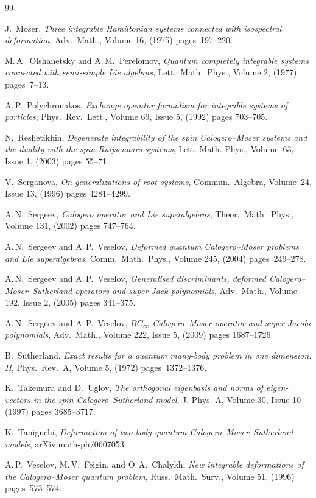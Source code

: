 \documentclass[12pt]{amsart}
\numberwithin{equation}{section}
\theoremstyle{definition}
\begin{document}
\begin{small}
\begin{thebibliography}{99}
{
J.\ Moser, \textit{Three integrable Hamiltonian systems connected with isospectral deformation}, Adv.\ Math., Volume 16, (1975) pages~197--220.

M.\,A.\ Olshanetsky and A.\,M.\ Perelomov, \textit{Quantum completely integrable systems connected with semi-simple Lie algebras}, Lett.\ Math.\ Phys., Volume 2, (1977) pages~7--13.

A.\,P.\ Polychronakos, \textit{Exchange operator formalism for integrable systems of particles}, Phys.\ Rev.\ Lett., Volume 69, Issue 5, (1992) pages 703--705.

N.\ Reshetikhin, \textit{ 
Degenerate integrability of the spin Calogero--Moser systems and the duality with the spin Ruijsenaars systems}, Lett. Math. Phys., Volume~63, Issue 1, (2003) pages 55--71.


V.\ Serganova, \textit{On generalizations of root systems}, Commun.\ Algebra, Volume~24, Issue 13, (1996) pages 4281--4299.

A.\,N.\ Sergeev, \textit{Calogero operator and Lie superalgebras}, Theor.\ Math.\ Phys., Volume 131, (2002) pages 747--764. 

A.\,N.\ Sergeev and A.\,P.\ Veselov, \textit{Deformed quantum Calogero--Moser problems and Lie superalgebras}, Comm.\ Math.\ Phys., Volume 245, (2004) pages~249--278.

A.\,N.\ Sergeev and A.\,P.\ Veselov, \textit{Generalised discriminants, deformed Calogero--Moser--Sutherland operators and super-Jack polynomials}, Adv.\ Math., Volume 192, Issue 2, (2005) pages 341--375. 

A.\,N.\ Sergeev and A.\,P.\ Veselov, \textit{$BC_\infty$ Calogero--Moser operator and super Jacobi polynomials}, Adv.\ Math., Volume 222, Issue 5, (2009) pages 1687--1726.

B.\ Sutherland, \textit{Exact results for a quantum many-body problem in one dimension. II}, Phys.\ Rev.\ A, Volume 5, (1972) pages~1372--1376.

K.\ Takemura and D.\ Uglov, \textit{The orthogonal eigenbasis and norms of eigen-
vectors in the spin Calogero--Sutherland model}, J. Phys. A, Volume 30, Issue 10  (1997) pages 3685--3717.

K.\ Taniguchi, \textit{Deformation of two body quantum Calogero--Moser--Sutherland models}, arXiv:math-ph/0607053.

A.\,P.\ Veselov, M.\,V.\ Feigin, and O.\,A.\ Chalykh, \textit{New integrable deformations of the Calogero--Moser quantum problem}, Russ.\ Math.\ Surv., Volume 51, (1996) pages~573--574.



}
\end{thebibliography}
\end{small}
 
\end{document}
